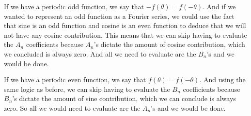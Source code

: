 \documentclass{article}
\begin{document}
If we have a periodic odd function, we say that $-f(\theta) = f(-\theta)$.
And if we wanted to represent an odd function as a Fourier series, we could use the fact that sine is an odd function and cosine is an even function to deduce that we will not have any cosine contribution.
This means that we can skip having to evaluate the $A_n$ coefficients because $A_n$'s dictate the amount of cosine contribution, which we concluded is always zero.
And all we need to evaluate are the $B_n$'s and we would be done.

If we have a periodic even function, we say that $f(\theta) = f(- \theta)$.
And using the same logic as before, we can skip having to evaluate the $B_n$ coefficients because $B_n$'s dictate the amount of sine contribution, which we can conclude is always zero.
So all we would need to evaluate are the $A_n$'s and we would be done.
\end{document}
